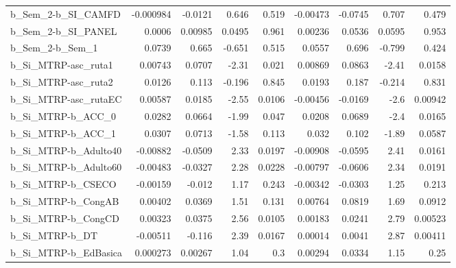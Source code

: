 \begin{tabular}{lrrrrrrrr}
b\_Sem\_2-b\_SI\_CAMFD         &   -0.000984 &      -0.0121 &    0.646 &    0.519 &   -0.00473 &     -0.0745 &        0.707 &         0.479 \\
b\_Sem\_2-b\_SI\_PANEL         &      0.0006 &      0.00985 &   0.0495 &    0.961 &    0.00236 &      0.0536 &       0.0595 &         0.953 \\
b\_Sem\_2-b\_Sem\_1            &      0.0739 &        0.665 &   -0.651 &    0.515 &     0.0557 &       0.696 &       -0.799 &         0.424 \\
b\_Si\_MTRP-asc\_ruta1        &     0.00743 &       0.0707 &    -2.31 &    0.021 &    0.00869 &      0.0863 &        -2.41 &        0.0158 \\
b\_Si\_MTRP-asc\_ruta2        &      0.0126 &        0.113 &   -0.196 &    0.845 &     0.0193 &       0.187 &       -0.214 &         0.831 \\
b\_Si\_MTRP-asc\_rutaEC       &     0.00587 &       0.0185 &    -2.55 &   0.0106 &   -0.00456 &     -0.0169 &         -2.6 &       0.00942 \\
b\_Si\_MTRP-b\_ACC\_0          &      0.0282 &       0.0664 &    -1.99 &    0.047 &     0.0208 &      0.0689 &         -2.4 &        0.0165 \\
b\_Si\_MTRP-b\_ACC\_1          &      0.0307 &       0.0713 &    -1.58 &    0.113 &      0.032 &       0.102 &        -1.89 &        0.0587 \\
b\_Si\_MTRP-b\_Adulto40       &    -0.00882 &      -0.0509 &     2.33 &   0.0197 &   -0.00908 &     -0.0595 &         2.41 &        0.0161 \\
b\_Si\_MTRP-b\_Adulto60       &    -0.00483 &      -0.0327 &     2.28 &   0.0228 &   -0.00797 &     -0.0606 &         2.34 &        0.0191 \\
b\_Si\_MTRP-b\_CSECO          &    -0.00159 &       -0.012 &     1.17 &    0.243 &   -0.00342 &     -0.0303 &         1.25 &         0.213 \\
b\_Si\_MTRP-b\_CongAB         &     0.00402 &       0.0369 &     1.51 &    0.131 &    0.00764 &      0.0819 &         1.69 &        0.0912 \\
b\_Si\_MTRP-b\_CongCD         &     0.00323 &       0.0375 &     2.56 &   0.0105 &    0.00183 &      0.0241 &         2.79 &       0.00523 \\
b\_Si\_MTRP-b\_DT             &    -0.00511 &       -0.116 &     2.39 &   0.0167 &    0.00014 &      0.0041 &         2.87 &       0.00411 \\
b\_Si\_MTRP-b\_EdBasica       &    0.000273 &      0.00267 &     1.04 &      0.3 &    0.00294 &      0.0334 &         1.15 &          0.25 \\

\end{tabular}
